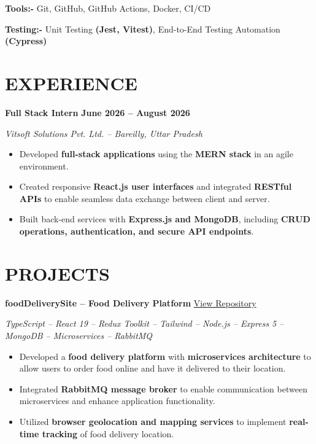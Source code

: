 \documentclass[10pt,a4paper]{article}
\begin{document}
\textbf{Tools:-}
Git, GitHub, GitHub Actions, Docker, CI/CD

\textbf{Testing:-}
Unit Testing \textbf{(Jest, Vitest)}, End-to-End Testing Automation \textbf{(Cypress)}

\section*{EXPERIENCE}

\textbf{Full Stack Intern}
\hfill
\textbf{June 2026 -- August 2026}

\textit{Vitsoft Solutions Pvt. Ltd. -- Bareilly, Uttar Pradesh}

\begin{itemize}

    \item Developed \textbf{full-stack applications} using the \textbf{MERN stack} in an agile environment.

    \item Created responsive \textbf{React.js user interfaces} and integrated \textbf{RESTful APIs} to enable seamless data exchange between client and server.

    \item Built back-end services with \textbf{Express.js and MongoDB}, including \textbf{CRUD operations, authentication, and secure API endpoints}.

\end{itemize}

\section*{PROJECTS}

\textbf{foodDeliverySite -- Food Delivery Platform}
\hfill
\href{https://github.com/Amjadkhan9756/foodDeliverySite}
{View Repository}

\textit{TypeScript -- React 19 -- Redux Toolkit -- Tailwind -- Node.js -- Express 5 -- MongoDB -- Microservices -- RabbitMQ}

\begin{itemize}

    \item Developed a \textbf{food delivery platform} with \textbf{microservices architecture} to allow users to order food online and have it delivered to their location.

    \item Integrated \textbf{RabbitMQ message broker} to enable communication between microservices and enhance application functionality.

    \item Utilized \textbf{browser geolocation and mapping services} to implement \textbf{real-time tracking} of food delivery location.

\end{itemize}
\end{document}
